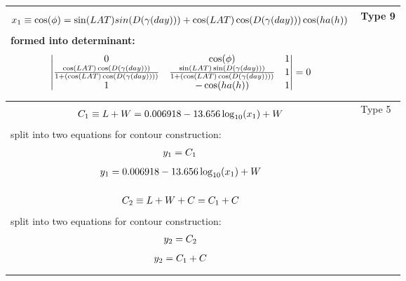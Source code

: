 \documentclass[a4paper,11pt,english]{sphinxmanual}
\begin{document}
\begin{longtable}{|p{14cm}|p{2cm}|}
\begin{gather}
\begin{split}x_1 \equiv \cos(\phi)=\sin(LAT)sin(D(\gamma(day)))+\cos(LAT)\cos(D(\gamma(day)))\cos(ha(h))\,\end{split}\notag
\end{gather}
formed into determinant:
\begin{gather}
\begin{split}{
\begin{vmatrix}
        0  & \cos(\phi) & 1 \\
       \frac{\cos(LAT)\cos(D(\gamma(day)))}{1+(\cos(LAT)\cos(D(\gamma(day))))}  & \frac{\sin(LAT)\sin(D(\gamma(day)))}{1+(\cos(LAT)\cos(D(\gamma(day))))} & 1 \\
       1  & -\cos(ha(h)) & 1 \\
\end{vmatrix} = 0 }\end{split}\notag
\end{gather} & 
Type 9
\\
\hline\begin{gather}
\begin{split}C_1 \equiv L+W = 0.006918-13.656 \log_{10}(x_1)+W\end{split}\notag
\end{gather}
split into two equations for contour construction:
\begin{gather}
\begin{split}y_1 = C_1 \,\end{split}\notag
\end{gather}\begin{gather}
\begin{split}y_1 = 0.006918-13.656  \log_{10}(x_1)+W\end{split}\notag
\end{gather} & 
Type 5
\\
\hline\begin{gather}
\begin{split}C_2 \equiv L+W+C = C_1+C\end{split}\notag
\end{gather}
split into two equations for contour construction:
\begin{gather}
\begin{split}y_2 = C_2\end{split}\notag
\end{gather}\begin{gather}
\begin{split}y_2 = C_1+C\end{split}\notag

\end{gather}
\end{longtable}
\end{document}
